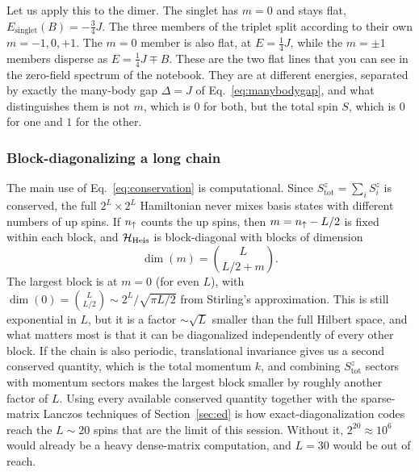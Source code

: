 \documentclass[lecture_notes.tex]{subfiles}
\begin{document}
Let us apply this to the dimer. The singlet has $m=0$ and stays flat, $E_{\mathrm{singlet}}(B)=-\tfrac34
J$. The three members of the triplet split according to their own $m=-1,0,+1$. The $m=0$ member is
also flat, at $E=\tfrac14J$, while the $m=\pm1$ members disperse as $E=\tfrac14J\mp B$. These are the
two flat lines that you can see in the zero-field spectrum of the notebook. They are at different
energies, separated by exactly the many-body gap $\Delta=J$ of Eq.~\eqref{eq:manybodygap}, and what
distinguishes them is not $m$, which is $0$ for both, but the total spin $S$, which is $0$ for one
and $1$ for the other.

\subsubsection{Block-diagonalizing a long chain}
The main use of Eq.~\eqref{eq:conservation} is
computational. Since $S_{\mathrm{tot}}^z=\sum_i S_i^z$ is conserved, the full $2^L\times2^L$
Hamiltonian never mixes basis states with different numbers of up spins. If $n_\uparrow$ counts the up
spins, then $m=n_\uparrow-L/2$ is fixed within each block, and $\mathcal{H}_{\mathrm{Heis}}$ is block-diagonal
with blocks of dimension
\begin{equation}
  \dim(m) = \binom{L}{L/2+m}.
  \label{eq:szsector}
\end{equation}
The largest block is at $m=0$ (for even $L$), with $\dim(0)=\binom{L}{L/2}\sim 2^L/\sqrt{\pi L/2}$
from Stirling's approximation. This is still exponential in $L$, but it is a factor $\sim\sqrt L$
smaller than the full Hilbert space, and what matters most is that it can be diagonalized
independently of every other block. If the chain is also periodic, translational invariance gives us
a second conserved quantity, which is the total momentum $k$, and combining $S_{\mathrm{tot}}^z$
sectors with momentum sectors makes the largest block smaller by roughly another factor of $L$.
Using every available conserved quantity together with the sparse-matrix Lanczos techniques of
Section~\ref{sec:ed} is how exact-diagonalization codes reach the $L\sim20$ spins that are the limit
of this session. Without it, $2^{20}\approx10^6$ would already be a heavy dense-matrix computation,
and $L=30$ would be out of reach.
\end{document}

